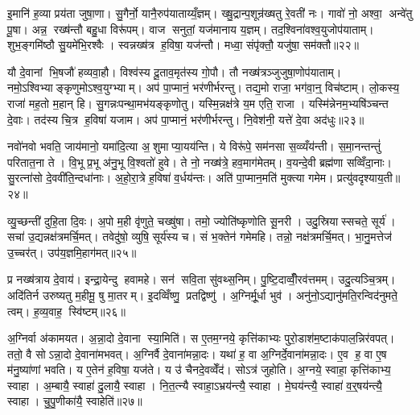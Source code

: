 इ॒मानि॑ ह॒व्या प्रय॑ता जुषा॒णा। सु॒गैर्नो॒ यानै॒रुप॑याताय्यँ॒ज्ञम्। ख्षु॒द्रान्प॒शून्र॑ख्षतु रे॒वती॑ नः। गावो॑ नो॒ अश्वा॒ अन्वे॑तु पू॒षा। अन्न॒ रख्ष॑न्तौ बहु॒धा विरू॑पम्। वाज सनुतां॒ यज॑मानाय य॒ज्ञम्। तद॒श्विना॑वश्व॒युजोप॑याताम्। शुभ॒ङ्गमि॑ष्ठौ सु॒यमे॑भि॒रश्वैः। स्वन्नख्ष॑त्र ह॒विषा॒ यज॑न्तौ। मध्वा॒ संपृ॑क्तौ॒ यजु॑षा॒ सम॑क्तौ॥२२॥

यौ दे॒वानां भि॒षजौ॑ हव्यवा॒हौ। विश्व॑स्य दू॒ताव॒मृत॑स्य गो॒पौ। तौ नख्ष॑त्रञ्जुजुषा॒णोप॑याताम्। नमो॒ऽश्विभ्याङ्कृणुमोऽश्व॒युग्भ्याम्। अप॑ पा॒प्मानं॒ भर॑णीर्भरन्तु। तद्य॒मो राजा॒ भग॑वा॒न्॒ विच॑ष्टाम्। लो॒कस्य॒ राजा॑ मह॒तो म॒हान् हि। सु॒गन्नःपन्था॒मभ॑यङ्कृणोतु। यस्मि॒न्नक्ष॑त्रे य॒म एति॒ राजा। यस्मि॑न्नेनम॒भ्यषि॑ञ्चन्त दे॒वाः। तद॑स्य चि॒त्र ह॒विषा॑ यजाम। अप॑ पा॒प्मानं॒ भर॑णीर्भरन्तु। नि॒वेश॑नी॒ यत्ते॑ दे॒वा अद॑धुः॥२३॥\anuvakamend[त॒तार॒ मह्यं॑ प्रास॒चीर्या यान्तु य॒ज्ञव्वाँच स्व॒स्ति दे॒वा अनु॑यन्ति॒ सर्वे॒ वाज॑बस्त्यौ॒ सम॑क्तौ दे॒वास्त्रीणि॑ च]

नवो॑नवो भवति॒ जाय॑मानो॒ यमा॑दि॒त्या अ॒शुमाप्या॒यय॑न्ति। ये विरू॑पे॒ सम॑नसा स॒व्व्यँय॑न्ती। स॒मा॒नन्तन्तुं॑ परितात॒ना ते। वि॒भू प्र॒भू अ॑नु॒भू वि॒श्वतो॑ हुवे। ते नो॒ नख्ष॑त्रे॒ हव॒माग॑मेतम्। व॒यन्दे॒वी ब्रह्म॑णा सव्विँदा॒नाः। सु॒रत्ना॑सो दे॒ववी॑ति॒न्दधा॑नाः। अ॒हो॒रा॒त्रे ह॒विषा॑ व॒र्धय॑न्तः। अति॑ पा॒प्मान॒मति॑ मुक्त्या गमेम। प्रत्यु॑वदृश्याय॒ती॥२४॥

व्यु॒च्छन्ती॑ दुहि॒ता दि॒वः। अ॒पो म॒ही वृ॑णुते॒ चख्षु॑षा। तमो॒ ज्योति॑ष्कृणोति सू॒नरी। उदु॒स्रियास्सचते॒ सूर्य॑। सचा॑ उ॒द्यन्नक्ष॑त्रमर्चि॒मत्। तवेदु॑षो॒ व्युषि॒ सूर्य॑स्य च। सं भ॒क्तेन॑ गमेमहि। तन्नो॒ नक्ष॑त्रमर्चि॒मत्। भा॒नु॒मत्तेज॑ उ॒च्चर॑त्। उप॑य॒ज्ञमि॒हाग॑मत्॥२५॥

प्र नख्ष॑त्राय दे॒वाय॑। इन्द्रा॒येन्दु हवामहे। सन॑ सवि॒ता सु॑वथ्स॒निम्। पु॒ष्टि॒दाव्वीँ॒रव॑त्तमम्। उदु॒त्यञ्चि॒त्रम्। अदि॑तिर्न उरुष्यतु म॒हीमू॒ षु मा॒तरम्। इ॒दव्विँष्णु॒ प्रतद्विष्णु॑। अ॒ग्निर्मू॒र्धा भुव॑। अनु॑नो॒ऽद्यानु॑मति॒रन्विद॑नुमते॒ त्वम्। ह॒व्य॒वाह॒ स्वि॑ष्टम्॥२६॥\anuvakamend[आ॒य॒त्य॑गम॒थ्स्वि॑ष्टम्]

अ॒ग्निर्वा अ॑कामयत। अ॒न्ना॒दो दे॒वाना स्या॒मिति॑। स ए॒तम॒ग्नये॒ कृत्ति॑काभ्यः पुरो॒डाश॑म॒ष्टाक॑पाल॒न्निर॑वपत्। ततो॒ वै सोऽन्ना॒दो दे॒वाना॑मभवत्। अ॒ग्निर्वै दे॒वाना॑मन्ना॒दः। यथा॑ ह॒ वा अ॒ग्निर्दे॒वाना॑मन्ना॒दः। ए॒व ह॒ वा ए॒ष म॑नु॒ष्या॑णां भवति। य ए॒तेन॑ ह॒विषा॒ यज॑ते। य उ॑ चैनदे॒वव्वेँद॑। सोऽत्र॑ जुहोति। अ॒ग्नये॒ स्वाहा॒ कृत्ति॑काभ्य॒ स्वाहा। अ॒म्बायै॒ स्वाहा॑ दु॒लायै॒ स्वाहा। नि॒त॒त्न्यै स्वाहा॒ऽभ्रय॑न्त्यै॒ स्वाहा। मे॒घय॑न्त्यै॒ स्वाहा॑ व॒र्॒षय॑न्त्यै॒ स्वाहा। चु॒पु॒णीका॑यै॒ स्वाहेति॑॥२७॥

